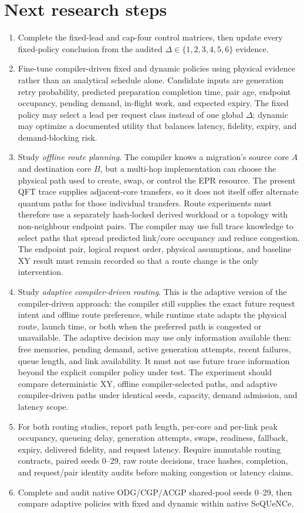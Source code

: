 \documentclass[11pt,a4paper]{report}
\begin{document}
\section{Next research steps}
\begin{enumerate}
\item Complete the fixed-lead and cap-four control matrices, then update every
fixed-policy conclusion from the audited $\Delta\in\{1,2,3,4,5,6\}$ evidence.
\item Fine-tune compiler-driven fixed and dynamic policies using physical
evidence rather than an analytical schedule alone. Candidate inputs are
generation retry probability, predicted preparation completion time, pair age,
endpoint occupancy, pending demand, in-flight work, and expected expiry. The
fixed policy may select a lead per request class instead of one global
$\Delta$; dynamic may optimize a documented utility that balances latency,
fidelity, expiry, and demand-blocking risk.
\item Study \emph{offline route planning}. The compiler knows a migration's
source core $A$ and destination core $B$, but a multi-hop implementation can
choose the physical path used to create, swap, or control the EPR resource.
The present QFT trace supplies adjacent-core transfers, so it does not itself
offer alternate quantum paths for those individual transfers. Route experiments
must therefore use a separately hash-locked derived workload or a topology with
non-neighbour endpoint pairs. The compiler may use full trace knowledge to
select paths that spread predicted link/core occupancy and reduce congestion.
The endpoint pair, logical request order, physical assumptions, and baseline
XY result must remain recorded so that a route change is the only intervention.
\item Study \emph{adaptive compiler-driven routing}. This is the adaptive
version of the compiler-driven approach: the compiler still supplies the exact
future request intent and offline route preference, while runtime state adapts
the physical route, launch time, or both when the preferred path is congested
or unavailable. The adaptive decision may use only information available then:
free memories, pending demand, active generation attempts, recent failures,
queue length, and link availability. It must not use future trace information
beyond the explicit compiler policy under test. The experiment should compare
deterministic XY, offline compiler-selected paths, and adaptive
compiler-driven paths under identical seeds, capacity, demand admission, and
latency scope.
\item For both routing studies, report path length, per-core and per-link peak
occupancy, queueing delay, generation attempts, swaps, readiness, fallback,
expiry, delivered fidelity, and request latency. Require immutable routing
contracts, paired seeds 0--29, raw route decisions, trace hashes, completion,
and request/pair identity audits before making congestion or latency claims.
\item Complete and audit native ODG/CGP/ACGP shared-pool seeds 0--29, then
compare adaptive policies with fixed and dynamic within native SeQUeNCe.
\end{enumerate}
\end{document}
